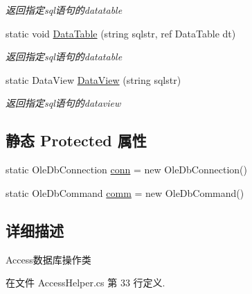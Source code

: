 \begin{DoxyCompactItemize}
\begin{DoxyCompactList}\small\item\em 返回指定sql语句的datatable \end{DoxyCompactList}\item 
static void \hyperlink{class_x_c_l_net_tools_1_1_data_base_1_1_access_1_1_access_helper_a4ee3cbd4a9212d6df954c2228c2ff2f4}{Data\-Table} (string sqlstr, ref Data\-Table dt)
\begin{DoxyCompactList}\small\item\em 返回指定sql语句的datatable \end{DoxyCompactList}\item 
static Data\-View \hyperlink{class_x_c_l_net_tools_1_1_data_base_1_1_access_1_1_access_helper_a3979a6d17790d9ecc1cc9c4bcf56de84}{Data\-View} (string sqlstr)
\begin{DoxyCompactList}\small\item\em 返回指定sql语句的dataview \end{DoxyCompactList}\end{DoxyCompactItemize}
\subsection*{静态 Protected 属性}
\begin{DoxyCompactItemize}
\item 
static Ole\-Db\-Connection \hyperlink{class_x_c_l_net_tools_1_1_data_base_1_1_access_1_1_access_helper_a6eacbf7cab97849252853ed926ffeb7e}{conn} = new Ole\-Db\-Connection()
\item 
static Ole\-Db\-Command \hyperlink{class_x_c_l_net_tools_1_1_data_base_1_1_access_1_1_access_helper_a11c37781255094b6abb069cf0b5c65df}{comm} = new Ole\-Db\-Command()
\end{DoxyCompactItemize}


\subsection{详细描述}
Access数据库操作类 



在文件 Access\-Helper.\-cs 第 33 行定义.



